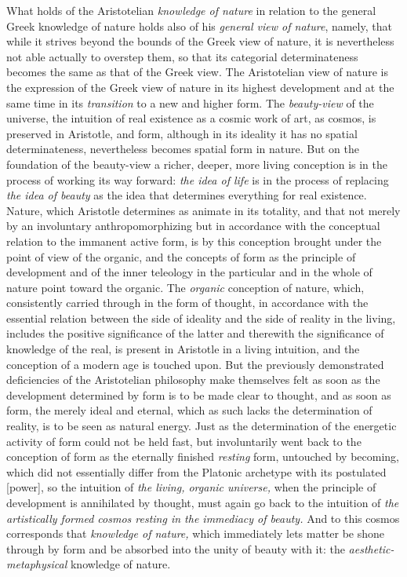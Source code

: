 What holds of the Aristotelian \emph{knowledge of nature} in relation
to the general Greek knowledge of nature holds also of his
\emph{general view of nature}, namely, that while it strives beyond the
bounds of the Greek view of nature, it is nevertheless not able
actually to overstep them, so that its categorial determinateness
becomes the same as that of the Greek view. The Aristotelian view of
nature is the expression of the Greek view of nature in its highest
development and at the same time in its \emph{transition} to a new and
higher form. The \emph{beauty-view} of the universe, the intuition of
real existence as a cosmic work of art, as cosmos, is preserved in
Aristotle, and form, although in its ideality it has no spatial
determinateness, nevertheless becomes spatial form in nature. But on
the foundation of the beauty-view a richer, deeper, more living
conception is in the process of working its way forward: \emph{the idea
of life} is in the process of replacing \emph{the idea of beauty} as
the idea that determines everything for real existence. Nature, which
Aristotle determines as animate in its totality, and that not merely by
an involuntary anthropomorphizing but in accordance with the conceptual
relation to the immanent active form, is by this conception brought
under the point of view of the organic, and the concepts of form as the
principle of development and of the inner teleology in the particular
and in the whole of nature point toward the organic. The \emph{organic}
conception of nature, which, consistently carried through in the form
of thought, in accordance with the essential relation between the side
of ideality and the side of reality in the living, includes the
positive significance of the latter and therewith the significance of
knowledge of the real, is present in Aristotle in a living intuition,
and the conception of a modern age is touched upon. But the previously
demonstrated deficiencies of the Aristotelian philosophy make
themselves felt as soon as the development determined by form is to be
made clear to thought, and as soon as form, the merely ideal and
eternal, which as such lacks the determination of reality, is to be
seen as natural energy. Just as the determination of the
energetic activity of form could not be held fast, but
involuntarily went back to the conception of form as the eternally
finished \emph{resting} form, untouched by becoming, which did not
essentially differ from the Platonic archetype with its postulated
 [power], so the intuition of \emph{the living, organic universe,}
when the principle of development is annihilated by thought, must again
go back to the intuition of \emph{the artistically formed cosmos
resting in the immediacy of beauty.} And to this cosmos corresponds that
\emph{knowledge of nature,} which immediately lets matter be shone
through by form and be absorbed into the unity of beauty with it: the
\emph{aesthetic-metaphysical} knowledge of nature.

